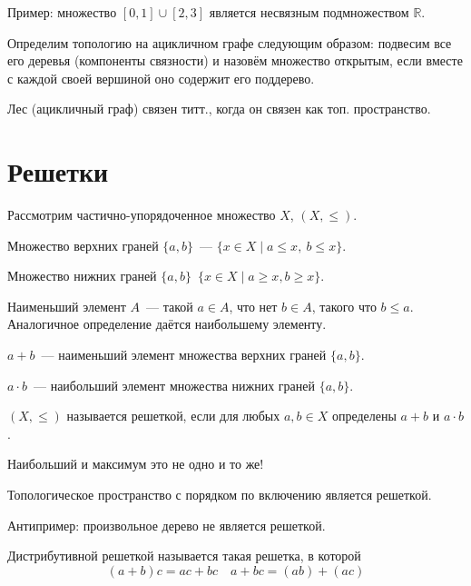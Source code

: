 Пример: множество $[0,1] \cup [2,3]$ является несвязным подмножеством $\mathbb{R}$. 

\begin{example}
    Определим топологию на ацикличном графе следующим образом: 
    подвесим все его деревья (компоненты связности) и назовём множество открытым, если вместе с каждой своей вершиной оно содержит его поддерево.      
\end{example}

\begin{theorem}
    Лес (ацикличный граф) связен титт., когда он связен как топ. пространство.
\end{theorem}

\section{Решетки}
\begin{definition}
    Рассмотрим частично-упорядоченное множество $X$, $(X, \leqslant)$.
    
    Множество верхних граней $\{a,b\}$~--- $\{ x \in X \mid a \leqslant x,\ b \leqslant x\}$.  
    
    Множество нижних граней $\{a,b\}$~$\{x \in X \mid a \geqslant x, b \geqslant x\}$.
    
    Наименьший элемент $A$~--- такой $a \in A$, что нет $b \in A$, такого что $b \leqslant a$.
    Аналогичное определение даётся наибольшему элементу.

    $a+b$~--- наименьший элемент множества верхних граней $\{a,b\}$.

    $a \cdot b$~--- наибольший элемент множества нижних граней $\{a,b\}$.

    $(X, \leqslant)$ называется решеткой, если для любых $a,b\in X$ определены $a+b$ и  $a\cdot b$.
\end{definition}

\begin{remark}
    Наибольший и максимум это не одно и то же!
\end{remark}

\begin{example}
    Топологическое пространство с порядком по включению является решеткой.
    
    Антипример: произвольное дерево не является решеткой.    
\end{example}

\begin{definition}
    Дистрибутивной решеткой называется такая решетка, в которой 
    \[(a+b)c = ac + bc \quad a + bc = (ab)+(ac)  \] 
\end{definition}

